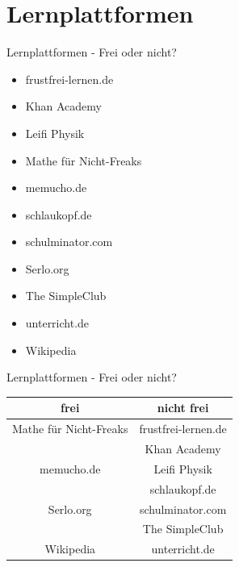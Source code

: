 \documentclass[14pt, usenames, dvipsnames, notesonly]{beamer}
\begin{document}
\section{Lernplattformen}

	\begin{frame}{Lernplattformen - Frei oder nicht?}
        \begin{minipage}{.5\textwidth}
            \begin{itemize}
                \item frustfrei-lernen.de
                \item Khan Academy
                \item Leifi Physik
                \item Mathe für Nicht-Freaks
                \item memucho.de
            \end{itemize}
        \end{minipage}
        \begin{minipage}{.45\textwidth}
            \begin{itemize}
                \item schlaukopf.de
                \item schulminator.com
                \item Serlo.org
                \item The SimpleClub
                \item unterricht.de
                \item Wikipedia
            \end{itemize}
        \end{minipage}
	\end{frame}
	\begin{frame}{Lernplattformen - Frei oder nicht?}
        \begin{tabularx}{\textwidth}{c|c}
			\textbf{frei} & \textbf{nicht frei} \\
			\hline
			Mathe für Nicht-Freaks & frustfrei-lernen.de \\
			& Khan Academy \\
			memucho.de & Leifi Physik \\
			& schlaukopf.de \\
			Serlo.org & schulminator.com \\
			& The SimpleClub \\
			Wikipedia & unterricht.de \\
		\end{tabularx}
	\end{frame}
\end{document}
